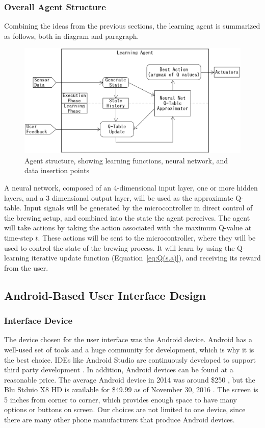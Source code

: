 \documentclass[draftclsnofoot,onecolumn,letterpaper,10pt]{IEEEtran}
\begin{document}
\subsubsection{Overall Agent Structure}
Combining the ideas from the previous sections, the learning agent is summarized as follows, both in diagram and paragraph.

\begin{figure}[h]\label{fig:AgentStructure}
\begin{center}
	\caption{Agent structure, showing learning functions, neural network, and data insertion points}
	\includegraphics[width=\linewidth]{totalagent.eps}
\end{center}
\end{figure}

A neural network, composed of an 4-dimensional input layer, one or more hidden layers, and a 3 dimensional output layer, will be used as the approximate Q-table.
Input signals will be generated by the microcontroller in direct control of the brewing setup, and combined into the state the agent perceives.
The agent will take actions by taking the action associated with the maximum Q-value at time-step $t$.
These actions will be sent to the microcontroller, where they will be used to control the state of the brewing process.
It will learn by using the Q-learning iterative update function (Equation~\ref{eq:Q(s,a)}), and receiving its reward from the user.


\subsection{Android-Based User Interface Design}\label{sec:android}%
\subsubsection{Interface Device}
The device chosen for the user interface was the Android device.
Android has a well-used set of tools and a huge community for development, which is why it is the best choice.
IDEs like Android Studio are continuously developed to support third party development \cite{AndroidStudio}.
In addition, Android devices can be found at a reasonable price.
The average Android device in 2014 was around \$250 \cite{AndroidStats}, but the Blu Stduio X8 HD is available for \$49.99 as of November 30, 2016 \cite{BluStudioX8}.
The screen is 5 inches from corner to corner, which provides enough space to have many options or buttons on screen.
Our choices are not limited to one device, since there are many other phone manufacturers that produce Android devices.
\end{document}
